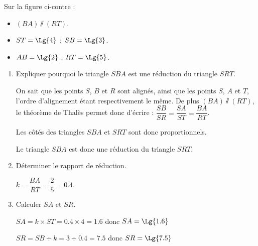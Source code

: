     \phantom{rrr}

    \begin{minipage}{0.3\linewidth}
         Sur la figure ci-contre :
        \begin{itemize}
            \item $(BA)\sslash (RT)$.
            \item $ST=\Lg{4}$ ; $SB=\Lg{3}$.
            \item $AB=\Lg{2}$ ; $RT=\Lg{5}$.
        \end{itemize}
    \end{minipage}
    \begin{minipage}{0.3\linewidth}
        \hspace*{-10mm}
    \end{minipage}

    \begin{enumerate}
        \item Expliquer pourquoi le triangle $SBA$ est une réduction du triangle $SRT$.

        {\color{red}On sait que les points $S$, $B$ et $R$ sont alignés, ainsi que les points $S$, $A$ et $T$,
        l'ordre d'alignement étant respectivement le même. De plus $(BA)\sslash (RT)$, le théorème de Thalès permet donc d'écrire :
        $\dfrac{SB}{SR}=\dfrac{SA}{ST}=\dfrac{BA}{RT}$.

        Les côtés des triangles $SBA$ et $SRT$ sont donc proportionnels.

        Le triangle $SBA$ est donc une réduction du triangle $SRT$.
        }
        \item Déterminer le rapport de réduction.

        {\color{red}$k=\dfrac{BA}{RT}=\dfrac{2}{5}=\num{0.4}$.}
        \item Calculer $SA$ et $SR$.

        {\color{red} $SA=k\times ST=\num{0.4}\times 4=\num{1.6}$ donc $SA=\Lg{1.6}$

        $SR=SB\div k=3\div\num{0.4}=\num{7.5}$ donc $SR=\Lg{7.5}$
        }
    \end{enumerate}
